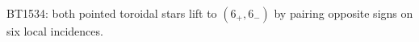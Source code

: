 \begin{center}\small
BT1534: both pointed toroidal stars lift to $(6_+,6_-)$ by pairing opposite signs on six local incidences.
\end{center}

